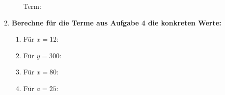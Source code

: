 \begin{enumerate}[label=\arabic*., resume]
\begin{enumerate}[label=\alph*)]
        Term: \underline{\hspace{4cm}}

    \end{enumerate}

    \vspace{1cm}

    \item \textbf{Berechne für die Terme aus Aufgabe 4 die konkreten Werte:}

    \vspace{0.5cm}

    \begin{enumerate}[label=\alph*)]
        \item Für $x = 12$: \underline{\hspace{3cm}}
        \vspace{0.3cm}
        \item Für $y = 300$: \underline{\hspace{3cm}}
        \vspace{0.3cm}
        \item Für $x = 80$: \underline{\hspace{3cm}}
        \vspace{0.3cm}
        \item Für $a = 25$: \underline{\hspace{3cm}}
    \end{enumerate}

\end{enumerate}
